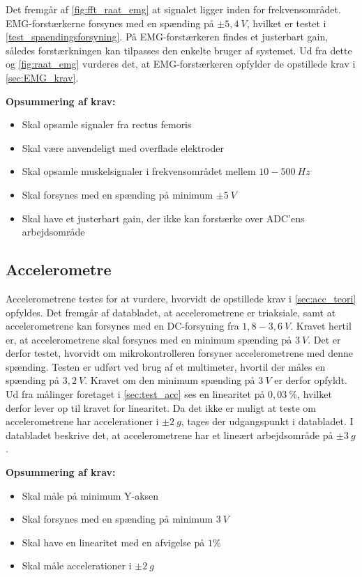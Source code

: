 \noindent
Det fremgår af \autoref{fig:fft_raat_emg} at signalet ligger inden for frekvensområdet. 
EMG-forstærkerne forsynes med en spænding på $\pm 5,4~V$, hvilket er testet i \autoref{test_spaendingsforsyning}.
På EMG-forstærkeren findes et justerbart gain, således forstærkningen kan tilpasses den enkelte bruger af systemet. Ud fra dette og \autoref{fig:raat_emg} vurderes det, at EMG-forstærkeren opfylder de opstillede krav i \autoref{sec:EMG_krav}.

\vspace{3mm}
\textbf{Opsummering af krav:}
\begin{itemize}
\item[\text{\sffamily \checkmark}] Skal opsamle signaler fra rectus femoris
\item[\text{\sffamily \checkmark}] Skal være anvendeligt med overflade elektroder
\item[\text{\sffamily \checkmark}] Skal opsamle muskelsignaler i frekvensområdet mellem $10-500~Hz$
\item[\text{\sffamily \checkmark}] Skal forsynes med en spænding på minimum $\pm5~V$
\item[\text{\sffamily \checkmark}] Skal have et justerbart gain, der ikke kan forstærke over ADC'ens arbejdsområde
\end{itemize}


\subsection{Accelerometre}

Accelerometrene testes for at vurdere, hvorvidt de opstillede krav i \autoref{sec:acc_teori} opfyldes. 
Det fremgår af databladet, at accelerometrene er triaksiale, samt at accelerometrene kan forsynes med en DC-forsyning fra $1,8-3,6~V$. Kravet hertil er, at accelerometrene skal forsynes med en minimum spænding på $3~V$. Det er derfor testet, hvorvidt om mikrokontrolleren forsyner accelerometrene med denne spænding. Testen er udført ved brug af et multimeter, hvortil der måles en spænding på $3,2~V$. Kravet om den minimum spænding på $3~V$ er derfor opfyldt.
Ud fra målinger foretaget i \autoref{sec:test_acc} ses en linearitet på $0,03~\%$, hvilket derfor lever op til kravet for linearitet. Da det ikke er muligt at teste om accelerometrene har accelerationer i $\pm2~g$, tages der udgangspunkt i databladet. I databladet beskrive det, at accelerometrene har et lineært arbejdsområde på $\pm 3~g$.

\vspace{3mm}
\textbf{Opsummering af krav:}
\begin{itemize}
\item[\text{\sffamily \checkmark}] Skal måle på minimum Y-aksen
\item[\text{\sffamily \checkmark}] Skal forsynes med en spænding på minimum $3~V$
\item[\text{\sffamily \checkmark}] Skal have en linearitet med en afvigelse på $1\%$
\item[\text{\sffamily \checkmark}] Skal måle accelerationer i $\pm2~g$
\end{itemize}

